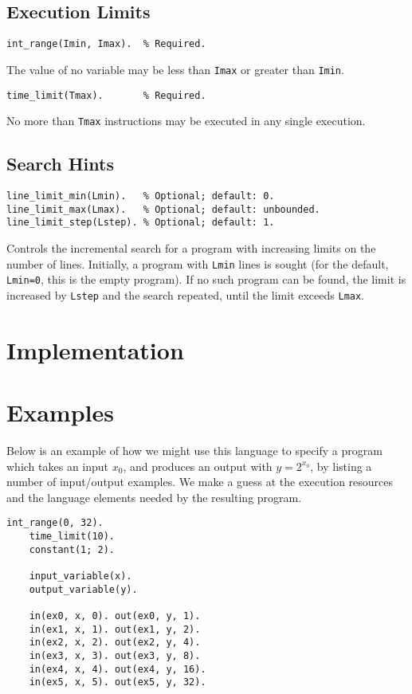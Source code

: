 \documentclass[a4paper,twoside,notitlepage]{report}
\newcommand{\ttt}{\texttt}
\begin{document}
\subsection{Execution Limits}
\begin{Verbatim}[samepage=true]
int_range(Imin, Imax).  % Required.
\end{Verbatim}
The value of no variable may be less than \ttt{Imax} or greater than 
\ttt{Imin}.

\begin{Verbatim}[samepage=true]
time_limit(Tmax).       % Required.
\end{Verbatim}
No more than \ttt{Tmax} instructions may be executed in any single execution.

\subsection{Search Hints}
\begin{Verbatim}[samepage=true]
line_limit_min(Lmin).   % Optional; default: 0.
line_limit_max(Lmax).   % Optional; default: unbounded.
line_limit_step(Lstep). % Optional; default: 1.
\end{Verbatim}
Controls the incremental search for a program with increasing limits on 
the number of lines. Initially, a program with \ttt{Lmin} lines is sought 
(for the default, \verb|Lmin=0|, this is the empty program). If no such 
program can be found, the limit is increased by \ttt{Lstep} and the search 
repeated, until the limit exceeds \ttt{Lmax}.

\section{Implementation}


\section{Examples}
Below is an example of how we might use this language to specify a program 
which takes an input $x_0$, and produces an output with $y = 2^{x_0}$, by 
listing a number of input/output examples. We make a guess at the 
execution resources and the language elements needed by the resulting 
program.

\begin{Verbatim}[samepage=true]
    int_range(0, 32).
    time_limit(10).
    constant(1; 2).

    input_variable(x).
    output_variable(y).

    in(ex0, x, 0). out(ex0, y, 1).
    in(ex1, x, 1). out(ex1, y, 2).
    in(ex2, x, 2). out(ex2, y, 4).
    in(ex3, x, 3). out(ex3, y, 8).
    in(ex4, x, 4). out(ex4, y, 16).
    in(ex5, x, 5). out(ex5, y, 32).
\end{Verbatim}
\end{document}
